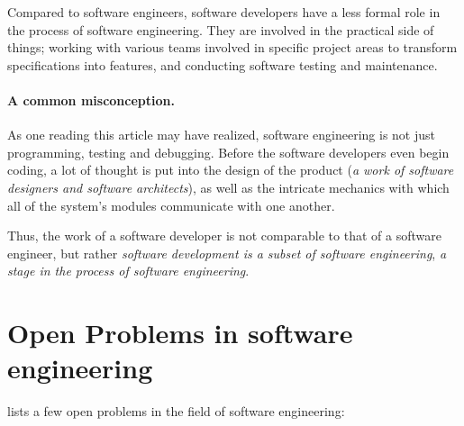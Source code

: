 \documentclass[a4paper]{article}
\begin{document}
                Compared to software engineers, software developers have a less formal role in the process of software engineering. They are involved in the practical side of things; working with various teams involved in specific project areas to transform specifications into features, and conducting software testing and maintenance.

            \paragraph{A common misconception.} 
                As one reading this article may have realized, software engineering is not just programming, testing and debugging. Before the software developers even begin coding, a lot of thought is put into the design of the product (\emph{a work of software designers and software architects}), as well as the intricate mechanics with which all of the system's modules communicate with one another.

                Thus, the work of a software developer is not comparable to that of a software engineer, but rather \emph{software development is a subset of software engineering}, \emph{a stage in the process of software engineering}.

    \newpage
    \section{Open Problems in software engineering}

            \cite{wikiversityUnsolvedProblems} lists a few open problems in the field of software engineering:
\end{document}
